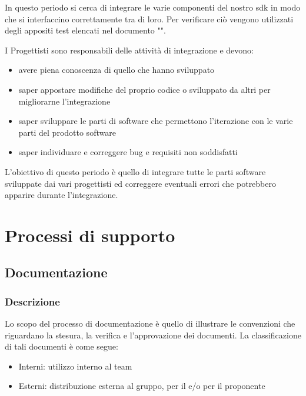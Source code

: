 In questo periodo si cerca di integrare le varie componenti del nostro sdk in modo che si interfaccino correttamente tra di loro.
Per verificare ciò vengono utilizzati degli appositi test elencati nel documento "\pianodiqualifica".

I Progettisti sono responsabili delle attività di integrazione e devono:
\begin{itemize}
	\item avere piena conoscenza di quello che hanno sviluppato
	\item saper appostare modifiche del proprio codice o sviluppato da altri per migliorarne l'integrazione
	\item saper sviluppare le parti di software che permettono l'iterazione con le varie parti del prodotto software
	\item saper individuare e correggere bug e requisiti non soddisfatti
\end{itemize}

L'obiettivo di questo periodo è quello di integrare tutte le parti software sviluppate dai vari progettisti ed correggere eventuali errori che potrebbero apparire durante l'integrazione.





\section{Processi di supporto} 

\subsection{Documentazione}

\subsubsection{Descrizione }
Lo scopo del processo di documentazione è quello di illustrare le
convenzioni che riguardano la stesura, la verifica e l'approvazione
dei documenti. La classificazione di tali documenti è come segue: 
\begin{itemize} 
\item Interni: utilizzo interno al team
\item Esterni: distribuzione esterna al gruppo, per il  e/o per il proponente
\end{itemize}

